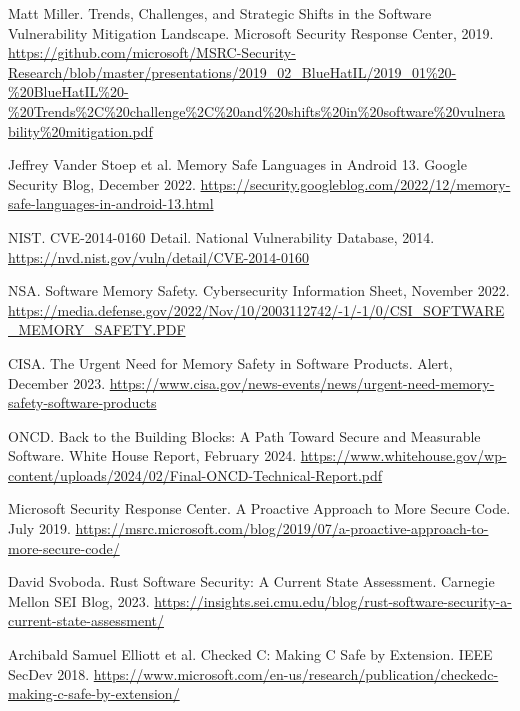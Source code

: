 \documentclass[11pt]{article}
\begin{document}
\newpage

\begin{thebibliography}{99}

Matt Miller.
\newblock Trends, Challenges, and Strategic Shifts in the Software Vulnerability Mitigation Landscape.
\newblock Microsoft Security Response Center, 2019.
\newblock \url{https://github.com/microsoft/MSRC-Security-Research/blob/master/presentations/2019_02_BlueHatIL/2019_01\%20-\%20BlueHatIL\%20-\%20Trends\%2C\%20challenge\%2C\%20and\%20shifts\%20in\%20software\%20vulnerability\%20mitigation.pdf}

Jeffrey Vander Stoep et al.
\newblock Memory Safe Languages in Android 13.
\newblock Google Security Blog, December 2022.
\newblock \url{https://security.googleblog.com/2022/12/memory-safe-languages-in-android-13.html}

NIST.
\newblock CVE-2014-0160 Detail.
\newblock National Vulnerability Database, 2014.
\newblock \url{https://nvd.nist.gov/vuln/detail/CVE-2014-0160}

NSA.
\newblock Software Memory Safety.
\newblock Cybersecurity Information Sheet, November 2022.
\newblock \url{https://media.defense.gov/2022/Nov/10/2003112742/-1/-1/0/CSI_SOFTWARE_MEMORY_SAFETY.PDF}

CISA.
\newblock The Urgent Need for Memory Safety in Software Products.
\newblock Alert, December 2023.
\newblock \url{https://www.cisa.gov/news-events/news/urgent-need-memory-safety-software-products}

ONCD.
\newblock Back to the Building Blocks: A Path Toward Secure and Measurable Software.
\newblock White House Report, February 2024.
\newblock \url{https://www.whitehouse.gov/wp-content/uploads/2024/02/Final-ONCD-Technical-Report.pdf}

Microsoft Security Response Center.
\newblock A Proactive Approach to More Secure Code.
\newblock July 2019.
\newblock \url{https://msrc.microsoft.com/blog/2019/07/a-proactive-approach-to-more-secure-code/}

David Svoboda.
\newblock Rust Software Security: A Current State Assessment.
\newblock Carnegie Mellon SEI Blog, 2023.
\newblock \url{https://insights.sei.cmu.edu/blog/rust-software-security-a-current-state-assessment/}

Archibald Samuel Elliott et al.
\newblock Checked C: Making C Safe by Extension.
\newblock IEEE SecDev 2018.
\newblock \url{https://www.microsoft.com/en-us/research/publication/checkedc-making-c-safe-by-extension/}


\end{thebibliography}
\end{document}
